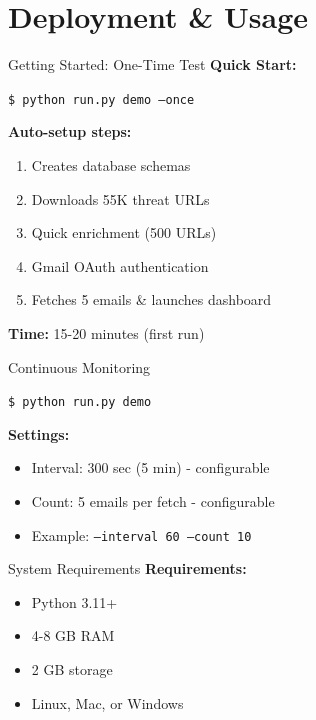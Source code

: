 \documentclass[aspectratio=169]{beamer}
\begin{document}
\section{Deployment \& Usage}

\begin{frame}{Getting Started: One-Time Test}
\small
\textbf{Quick Start:}

\begin{block}{}
\texttt{\$ python run.py demo --once}
\end{block}

\vspace{0.2cm}
\textbf{Auto-setup steps:}
\begin{enumerate}
    \item Creates database schemas
    \item Downloads 55K threat URLs
    \item Quick enrichment (500 URLs)
    \item Gmail OAuth authentication
    \item Fetches 5 emails \& launches dashboard
\end{enumerate}

\vspace{0.2cm}
\textbf{Time:} 15-20 minutes (first run)
\end{frame}

\begin{frame}{Continuous Monitoring}
\small
\begin{block}{}
\texttt{\$ python run.py demo}
\end{block}

\vspace{0.2cm}
\textbf{Settings:}
\begin{itemize}
    \item Interval: 300 sec (5 min) - configurable
    \item Count: 5 emails per fetch - configurable
    \item Example: \texttt{--interval 60 --count 10}
\end{itemize}
\end{frame}

\begin{frame}{System Requirements}
\small
\textbf{Requirements:}
\begin{itemize}
    \item Python 3.11+
    \item 4-8 GB RAM
    \item 2 GB storage
    \item Linux, Mac, or Windows
\end{itemize}
\end{frame}
\end{document}
